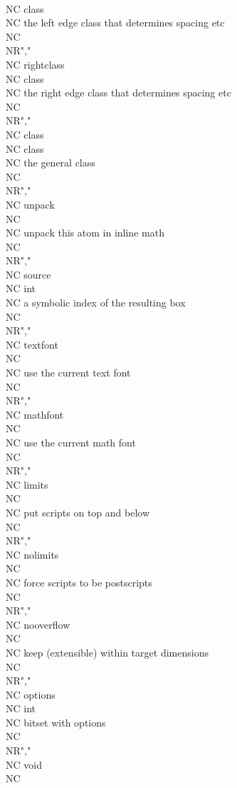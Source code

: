   \\NC class   \\NC the left edge class that determines spacing etc \\NC \\NR","\\NC rightclass \\NC class   \\NC the right edge class that determines spacing etc \\NC \\NR","\\NC class      \\NC class   \\NC the general class \\NC \\NR","\\NC unpack     \\NC         \\NC unpack this atom in inline math \\NC \\NR","\\NC source     \\NC int     \\NC a symbolic index of the resulting box \\NC \\NR","\\NC textfont   \\NC         \\NC use the current text font \\NC \\NR","\\NC mathfont   \\NC         \\NC use the current math font \\NC \\NR","\\NC limits     \\NC         \\NC put scripts on top and below \\NC \\NR","\\NC nolimits   \\NC         \\NC force scripts to be postscripts \\NC \\NR","\\NC nooverflow \\NC         \\NC keep (extensible) within target dimensions \\NC \\NR","\\NC options    \\NC int     \\NC bitset with options \\NC \\NR","\\NC void       \\NC   